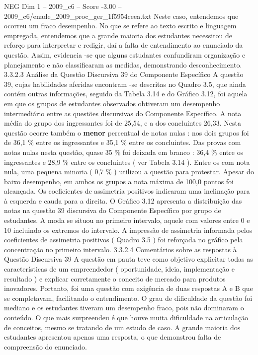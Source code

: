 \begin{textsample}{NEG Dim 1 – 2009\_c6 – Score -3.00 – 2009\_c6/enade\_2009\_proc\_ger\_1f5954ceea.txt}
Neste caso, entendemos que ocorreu um fraco desempenho.
No que se refere ao texto escrito e linguagem empregada, entendemos que a grande maioria dos estudantes necessitou de reforço para interpretar e redigir, daí a falta de entendimento ao enunciado da questão.
Assim, evidencia -se que alguns estudantes confundiram organização e planejamento e não classificaram as medidas, demonstrando desconhecimento. 3.3.2.3 Análise da Questão Discursiva 39 do Componente Específico A questão 39, cujas habilidades aferidas encontram -se descritas no Quadro 3.5, que ainda contém outras informações, seguido da Tabela 3.14 e do Gráfico 3.12, foi aquela em que os grupos de estudantes observados obtiveram um desempenho intermediário entre as questões discursivas do Componente Específico.
A nota média do grupo dos ingressantes foi de 25,54, e a dos concluintes 26,33.
Nesta questão ocorre também o \textbf{menor} percentual de notas nulas : nos dois grupos foi de 36,1 \% entre os ingressantes e 35,1 \% entre os concluintes.
Das provas com notas nulas nesta questão, quase 35 \% foi deixada em branco : 36,4 \% entre os ingressantes e 28,9 \% entre os concluintes ( ver Tabela 3.14 ).
Entre os com nota nula, uma pequena minoria ( 0,7 \% ) utilizou a questão para protestar.
Apesar do baixo desempenho, em ambos os grupos a nota máxima de 100,0 pontos foi alcançada.
Os coeficientes de assimetria positivos indicaram uma inclinação para à esquerda e cauda para a direita.
O Gráfico 3.12 apresenta a distribuição das notas na questão 39 discursiva do Componente Específico por grupo de estudantes.
A moda se situou no primeiro intervalo, aquele com valores entre 0 e 10 incluindo os extremos do intervalo.
A impressão de assimetria informada pelos coeficientes de assimetria positivos ( Quadro 3.5 ) foi reforçada no gráfico pela concentração no primeiro intervalo. 3.3.2.4 Comentários sobre as respostas à Questão Discursiva 39 A questão em pauta teve como objetivo explicitar todas as características de um empreendedor ( oportunidade, ideia, implementação e resultado ) e explicar corretamente o conceito de mercado para produtos inovadores.
Portanto, foi uma questão com exigência de duas respostas A e B que se completavam, facilitando o entendimento.
O grau de dificuldade da questão foi mediano e os estudantes tiveram um desempenho fraco, pois não dominaram o conteúdo.
O que mais surpreendeu é que houve muita dificuldade na articulação de conceitos, mesmo se tratando de um estudo de caso.
A grande maioria dos estudantes apresentou apenas uma resposta, o que demonstrou falta de compreensão do enunciado.

\end{textsample}
